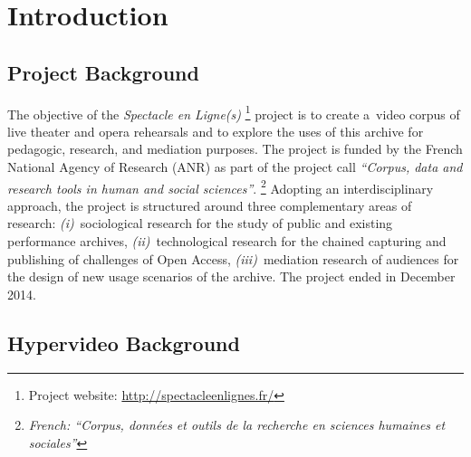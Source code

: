 \documentclass[runningheads,a4paper]{llncs}
\begin{document}
\section{Introduction}

\subsection{Project Background}

The objective of the \emph{Spectacle en Ligne(s)}%
\footnote{Project website: \url{http://spectacleenlignes.fr/}} project is to create a~video corpus
of live theater and opera rehearsals and to explore the uses of this archive for
pedagogic, research, and mediation purposes.
The project is funded by the French National Agency of Research (ANR) as part of the project call
\textit{``Corpus, data and research tools in human and social sciences''}.%
\footnote{\textit{French: ``Corpus, données et outils de la recherche en sciences humaines et sociales''}}
Adopting an interdisciplinary approach, the project is structured around three complementary areas of research:
\emph{(i)}~sociological research for the study of public and existing performance archives,
\emph{(ii)}~technological research for the chained capturing and publishing of challenges of Open Access,
\emph{(iii)}~mediation research of audiences for the design of new usage scenarios of the archive.
The project ended in December 2014.

\subsection{Hypervideo Background}
\end{document}
